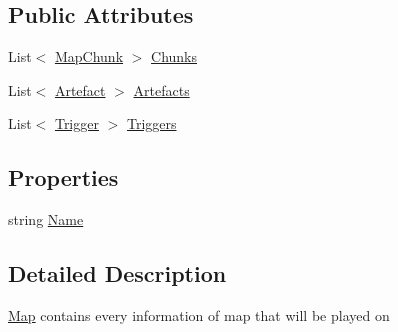 \subsection*{Public Attributes}
\begin{DoxyCompactItemize}
\item 
List$<$ \hyperlink{classgearit_1_1src_1_1editor_1_1map_1_1_map_chunk}{Map\+Chunk} $>$ \hyperlink{classgearit_1_1src_1_1map_1_1_map_a2f224448cfe74111f67cbac2ef5eb862}{Chunks}
\item 
List$<$ \hyperlink{classgearit_1_1src_1_1map_1_1_artefact}{Artefact} $>$ \hyperlink{classgearit_1_1src_1_1map_1_1_map_a5c13ea5c8712d296b450fdc90376e75c}{Artefacts}
\item 
List$<$ \hyperlink{classgearit_1_1src_1_1map_1_1_trigger}{Trigger} $>$ \hyperlink{classgearit_1_1src_1_1map_1_1_map_a956469edb846fff301c908e8bf38677b}{Triggers}
\end{DoxyCompactItemize}
\subsection*{Properties}
\begin{DoxyCompactItemize}
\item 
string \hyperlink{classgearit_1_1src_1_1map_1_1_map_a25a011fb58f57941c24e3c80207e2b21}{Name}
\end{DoxyCompactItemize}


\subsection{Detailed Description}
\hyperlink{classgearit_1_1src_1_1map_1_1_map}{Map} contains every information of map that will be played on 



